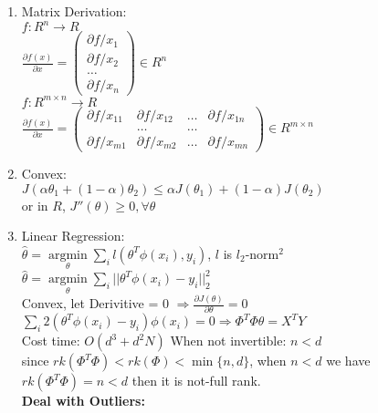 \documentclass[10pt]{article}
\DeclareMathOperator*{\argmin}{\arg\min}
\begin{document}
\begin{multicols}{2}
    \begin{enumerate}
        \item Matrix Derivation:\\
        $f: R^n \rightarrow R$\\
        $\frac{\partial f(x)}{\partial x} = \begin{pmatrix}
            \partial f/ x_1 \\ \partial f/ x_2 \\
            \dots \\ \partial f/ x_n
        \end{pmatrix} \in R^{n}$\\
        $f: R^{m\times n} \rightarrow R$\\
        $\frac{\partial f(x)}{\partial x} = \begin{pmatrix}
            \partial f/ x_{11} & \partial f / x_{12} & \dots & \partial f/ x_{1n} \\ & \dots & \dots & \\
            \partial f/ x_{m1} & \partial f / x_{m2} & \dots & \partial f/ x_{mn}
        \end{pmatrix} \in R^{m\times n}$
        \item Convex:\\
        $J(\alpha \theta_1 + (1-\alpha)\theta_2) \le \alpha J(\theta_1) + (1-\alpha)J(\theta_2)$ \\
        or in $R$, $J''(\theta) \ge 0, \forall \theta$ 
        \item Linear Regression:\\
        $\hat{\theta} = \argmin\limits_{\theta}\sum_i l(\theta^T\phi(x_i), y_i)$, $l$ is $l_2$-norm$^2$\\
        $\hat{\theta} = \argmin\limits_{\theta}\sum_i ||\theta^T\phi(x_i)- y_i||_2^2$\\
        Convex, let Derivitive = 0 $\Rightarrow \frac{\partial J(\theta)}{\partial \theta} = 0$ \\
        $\sum_i 2(\theta^T\phi(x_i)-y_i)\phi(x_i) = 0 \Rightarrow \Phi^T\Phi\theta = X^TY$ \\
        Cost time: $O(d^3 + d^2N)$
        When not invertible: $n < d$\\
        since $rk(\Phi^T\Phi) < rk(\Phi) < \min\{n,d\}$, when $n < d$ we have $rk(\Phi^T\Phi)  = n < d$ then it is not-full rank.\\
        \textbf{Deal with Outliers:}
        \begin{itemize}

\end{itemize}
\end{enumerate}
\end{multicols}
\end{document}
